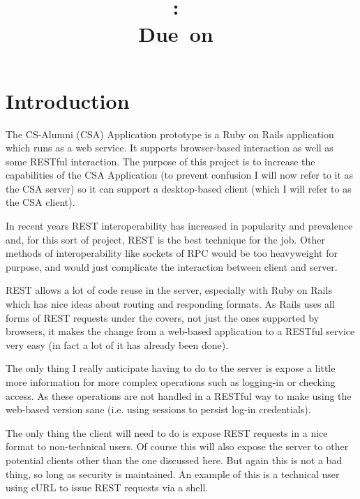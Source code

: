 \documentclass{article}
\title{
\vspace{2in}
\textmd{\textbf{\hmwkClass:\ \hmwkTitle}}\\
\normalsize\vspace{0.1in}\small{Due\ on\ \hmwkDueDate}\\
\vspace{3in}
}
\author{\textbf{\hmwkAuthorName}}
\date{} %
\begin{document}
\maketitle



\newpage
\tableofcontents
\newpage


\section{Introduction}
The CS-Alumni (CSA) Application prototype is a Ruby on Rails application which runs as a
web service. It supports browser-based interaction as well as some RESTful interaction.
The purpose of this project is to increase the capabilities of the CSA Application (to
prevent confusion I will now refer to it as the CSA server) so it can support a 
desktop-based client (which I will refer to as the CSA client).

In recent years REST interoperability has increased in popularity and prevalence and, for
this sort of project, REST is the best technique for the job. Other methods of 
interoperability like sockets of RPC would be too heavyweight for purpose, and would just
complicate the interaction between client and server.

REST allows a lot of code reuse in the server, especially with Ruby on Rails which has 
nice ideas about routing and responding formats. As Rails uses all forms of REST requests
under the covers, not just the ones supported by browsers, it makes the change from a 
web-based application to a RESTful service very easy (in fact a lot of it has already 
been done).

The only thing I really anticipate having to do to the server is expose a little more 
information for more complex operations such as logging-in or checking access. As these
operations are not handled in a RESTful way to make using the web-based version sane 
(i.e. using sessions to persist log-in credentials).

The only thing the client will need to do is expose REST requests in a nice format to
non-technical users. Of course this will also expose the server to other potential 
clients other than the one discussed here. But again this is not a bad thing, so long as
security is maintained. An example of this is a technical user using cURL to issue REST
requests via a shell.
\end{document}
